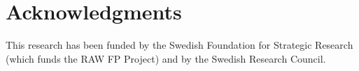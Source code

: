 \section*{Acknowledgments} 
This research has been funded by the Swedish Foundation for Strategic Research (which funds
the RAW FP Project) and
by the Swedish Research Council.



%
%





%


